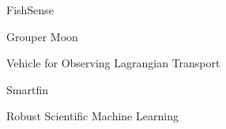 \item FishSense
\item Grouper Moon
\item Vehicle for Observing Lagrangian Transport
\item Smartfin
\item Robust Scientific Machine Learning
